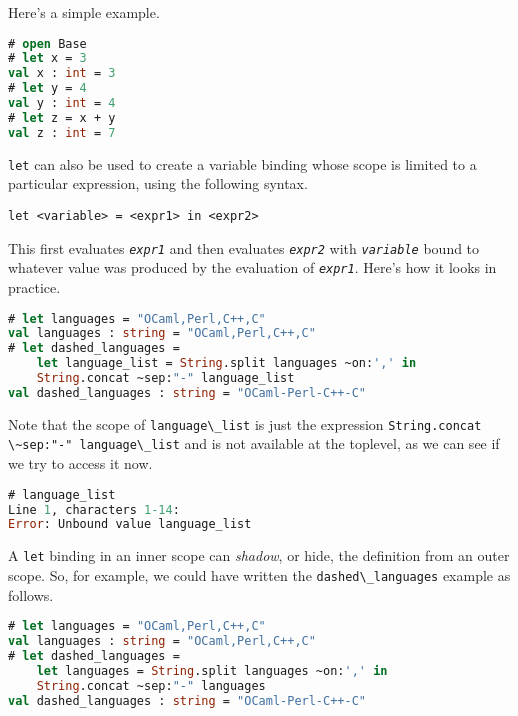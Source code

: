 Here's a simple example.

\begin{lstlisting}[language=Caml]
# open Base
# let x = 3
val x : int = 3
# let y = 4
val y : int = 4
# let z = x + y
val z : int = 7
\end{lstlisting}

\passthrough{\lstinline!let!} can also be used to create a variable
binding whose scope is limited to a particular expression, using the
following syntax.

\begin{lstlisting}
let <variable> = <expr1> in <expr2>
\end{lstlisting}

This first evaluates \emph{\passthrough{\lstinline!expr1!}} and then
evaluates \emph{\passthrough{\lstinline!expr2!}} with
\emph{\passthrough{\lstinline!variable!}} bound to whatever value was
produced by the evaluation of \emph{\passthrough{\lstinline!expr1!}}.
Here's how it looks in practice.

\begin{lstlisting}[language=Caml]
# let languages = "OCaml,Perl,C++,C"
val languages : string = "OCaml,Perl,C++,C"
# let dashed_languages =
    let language_list = String.split languages ~on:',' in
    String.concat ~sep:"-" language_list
val dashed_languages : string = "OCaml-Perl-C++-C"
\end{lstlisting}

Note that the scope of \passthrough{\lstinline!language\_list!} is just
the expression
\passthrough{\lstinline!String.concat \~sep:"-" language\_list!} and is
not available at the toplevel, as we can see if we try to access it now.

\begin{lstlisting}[language=Caml]
# language_list
Line 1, characters 1-14:
Error: Unbound value language_list
\end{lstlisting}

A \passthrough{\lstinline!let!} binding in an inner scope can
\emph{shadow}, or hide, the definition from an outer scope. So, for
example, we could have written the
\passthrough{\lstinline!dashed\_languages!} example as follows.

\begin{lstlisting}[language=Caml]
# let languages = "OCaml,Perl,C++,C"
val languages : string = "OCaml,Perl,C++,C"
# let dashed_languages =
    let languages = String.split languages ~on:',' in
    String.concat ~sep:"-" languages
val dashed_languages : string = "OCaml-Perl-C++-C"
\end{lstlisting}

